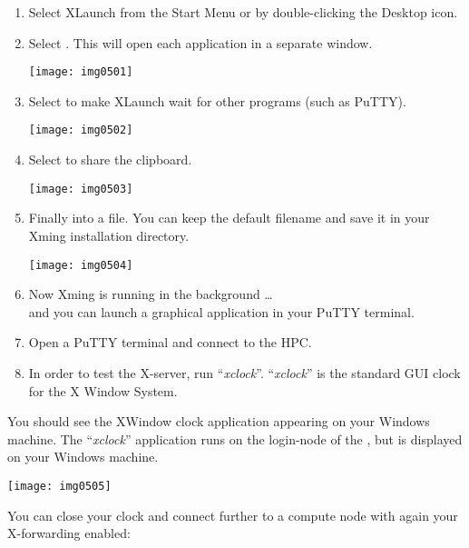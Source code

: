   \begin{enumerate}
  \item Select XLaunch from the Start Menu or by double-clicking the Desktop icon.

  \item  Select . This will open each application in a separate window.

  \texttt{[image: img0501]}  


  \item  Select  to make XLaunch wait for other programs (such as PuTTY).

  \texttt{[image: img0502]}


  \item  Select  to share the clipboard.

  \texttt{[image: img0503]}


  \item  Finally  into a file. You can keep the default filename and save it in your Xming installation directory.

  \texttt{[image: img0504]}

  \item  Now Xming is running in the background \ldots\\ and you can launch a graphical application in your PuTTY terminal.
  \item  Open a PuTTY terminal and connect  to the HPC.
  \item  In order to test the X-server, run ``\emph{xclock}''. ``\emph{xclock}'' is the standard GUI clock for the X Window System.
  \end{enumerate}

  \begin{prompt}
  \end{prompt}

  You should see the XWindow clock application appearing on your Windows machine.
  The ``\emph{xclock}'' application runs on the login-node of the \hpc, but is
  displayed on your Windows machine.

  \texttt{[image: img0505]}

  You can close your clock and connect further to a compute node with again your
  X-forwarding enabled:

